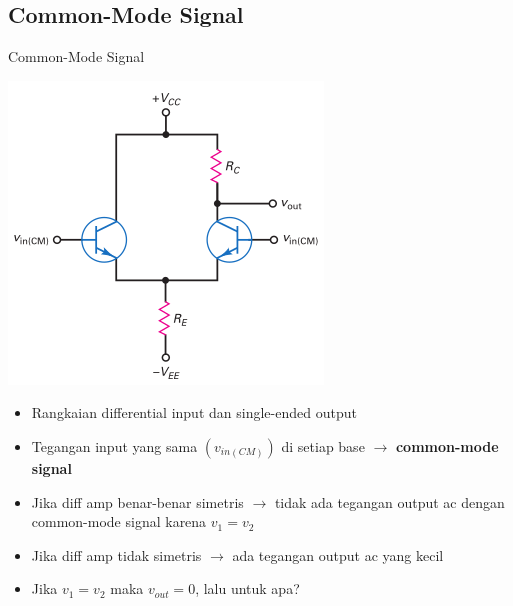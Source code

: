 \documentclass[aspectratio=169]{beamer}
\begin{document}
\subsection{Common-Mode Signal}
\begin{frame}{Common-Mode Signal}
	\begin{multicols}{2}
		\begin{center}
			\includegraphics[height=0.7\textheight]{gambar/01.common-mode_input_signal}
		\end{center}
		\columnbreak
		\begin{itemize}
			\item Rangkaian differential input dan single-ended output
			\item Tegangan input yang sama $( v_{in(CM)} )$ di setiap base $ \rightarrow $ \textbf{common-mode signal}
			\item Jika diff amp benar-benar simetris $ \rightarrow $ tidak ada tegangan output ac dengan common-mode signal karena $ v_1 = v_2 $
			\item Jika diff amp tidak simetris $ \rightarrow $ ada tegangan output ac yang kecil
			\item Jika $ v_1 = v_2 $ maka $ v_{out} = 0 $, lalu untuk apa?
		\end{itemize}
	\end{multicols}
\end{frame}
\end{document}
